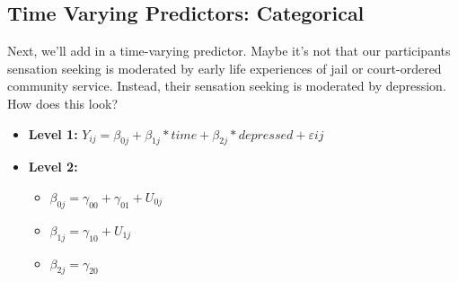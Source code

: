\documentclass[]{article}
\newenvironment{Shaded}{\begin{snugshade}}{\end{snugshade}}
\newcommand{\KeywordTok}[1]{\textcolor[rgb]{0.13,0.29,0.53}{\textbf{#1}}}
\newcommand{\DataTypeTok}[1]{\textcolor[rgb]{0.13,0.29,0.53}{#1}}
\newcommand{\DecValTok}[1]{\textcolor[rgb]{0.00,0.00,0.81}{#1}}
\newcommand{\FloatTok}[1]{\textcolor[rgb]{0.00,0.00,0.81}{#1}}
\newcommand{\StringTok}[1]{\textcolor[rgb]{0.31,0.60,0.02}{#1}}
\newcommand{\CommentTok}[1]{\textcolor[rgb]{0.56,0.35,0.01}{\textit{#1}}}
\newcommand{\OperatorTok}[1]{\textcolor[rgb]{0.81,0.36,0.00}{\textbf{#1}}}
\newcommand{\NormalTok}[1]{#1}
\begin{document}
\subsection{Time Varying Predictors:
Categorical}\label{time-varying-predictors-categorical}

Next, we'll add in a time-varying predictor. Maybe it's not that our
participants sensation seeking is moderated by early life experiences of
jail or court-ordered community service. Instead, their sensation
seeking is moderated by depression.\\
How does this look?

\begin{itemize}
  \item \textbf{Level 1:} $Y_{ij} = \beta_{0j} + \beta_{1j}*time + \beta_{2j}*depressed + \varepsilon{ij}$
  \item \textbf{Level 2:} 
    \begin{itemize} 
      \item $\beta_{0j} = \gamma_{00} + \gamma_{01} + U_{0j}$
      \item $\beta_{1j} = \gamma_{10} + U_{1j}$
      \item $\beta_{2j} = \gamma_{20}$
    \end{itemize}
\end{itemize}

\small

\begin{Shaded}
\end{Shaded}
\end{document}
